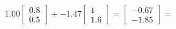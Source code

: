 \documentclass[preview]{standalone}
\begin{document}
\begin{align*}
1.00 \begin{bmatrix} 0.8 \\ 0.5 \end{bmatrix} + -1.47 \begin{bmatrix} 1 \\ 1.6 \end{bmatrix} = \begin{bmatrix} -0.67 \\ -1.85 \end{bmatrix} =
\end{align*}
\end{document}
